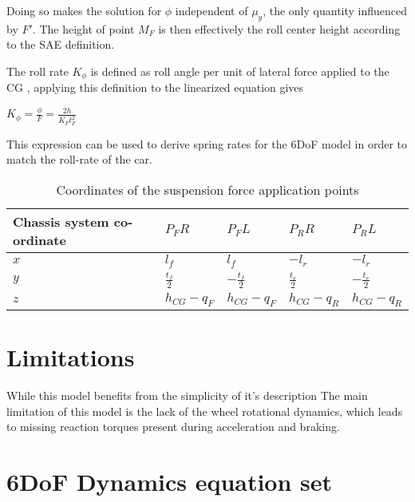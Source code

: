 Doing so makes the solution for $\phi$ independent of $\mu_y$, the only quantity influenced by $F'$. The height of point $M_F$ is then effectively the roll center height according to the SAE definition.

The roll rate $K_\phi$ is defined as roll angle per unit of lateral force applied to the CG , applying this definition to the linearized equation gives

$K_\phi = \frac{\phi}{F} = \frac{2h}{K_Ft_F^2}$

This expression can be used to derive spring rates for the 6DoF model in order to match the roll-rate of the car.

\begin{table}[ht]
\caption{Coordinates of the suspension force application points} %
\centering %
\begin{tabular}{l l l l l} %
\hline\hline %
Chassis system co-ordinate & $P_FR$ & $P_FL$ & $P_RR$ & $P_RL$ \\ [0.5ex] %
\hline %
$ x$ & $ l_f$ & $ l_f$ & $-l_r $ & $-l_r $\\ %
$ y$ & $ \frac{t_f}{2} $ & $ -\frac{t_f}{2}$ & $ \frac{t_r}{2}$ & $ -\frac{t_r}{2}$\\ %
$ z$ & $ h_{CG} - q_F $& $ h_{CG} - q_F $ & $ h_{CG} - q_R$ & $ h_{CG} - q_R$ \\ [1ex] %
\hline %
\end{tabular}
\label{table:susppoints} %
\end{table}

\section{Limitations}
\label{sec:6doflimits}
While this model benefits from the simplicity of it's description
The main limitation of this model is the lack of the wheel rotational dynamics, which leads to missing reaction torques present during acceleration and braking.
\section{6DoF Dynamics equation set}
\label{sec:6dofeq}
